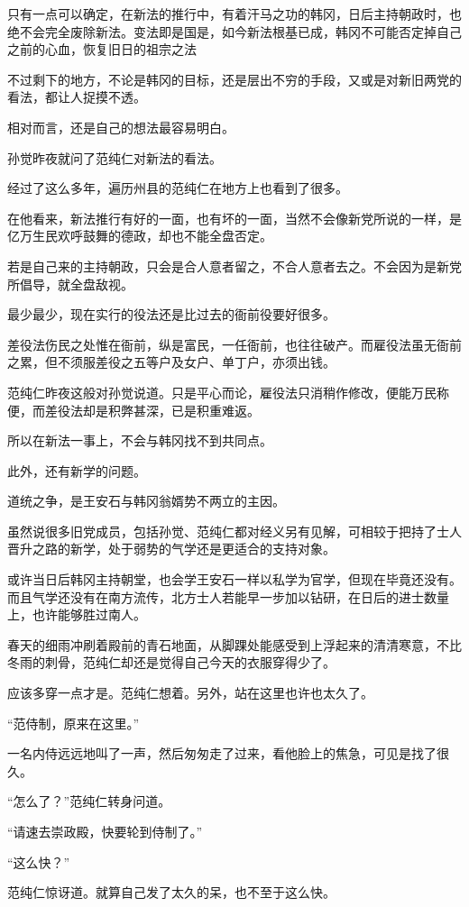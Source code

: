 只有一点可以确定，在新法的推行中，有着汗马之功的韩冈，日后主持朝政时，也绝不会完全废除新法。变法即是国是，如今新法根基已成，韩冈不可能否定掉自己之前的心血，恢复旧日的祖宗之法

不过剩下的地方，不论是韩冈的目标，还是层出不穷的手段，又或是对新旧两党的看法，都让人捉摸不透。

相对而言，还是自己的想法最容易明白。

孙觉昨夜就问了范纯仁对新法的看法。

经过了这么多年，遍历州县的范纯仁在地方上也看到了很多。

在他看来，新法推行有好的一面，也有坏的一面，当然不会像新党所说的一样，是亿万生民欢呼鼓舞的德政，却也不能全盘否定。

若是自己来的主持朝政，只会是合人意者留之，不合人意者去之。不会因为是新党所倡导，就全盘敌视。

最少最少，现在实行的役法还是比过去的衙前役要好很多。

差役法伤民之处惟在衙前，纵是富民，一任衙前，也往往破产。而雇役法虽无衙前之累，但不须服差役之五等户及女户、单丁户，亦须出钱。

范纯仁昨夜这般对孙觉说道。只是平心而论，雇役法只消稍作修改，便能万民称便，而差役法却是积弊甚深，已是积重难返。

所以在新法一事上，不会与韩冈找不到共同点。

此外，还有新学的问题。

道统之争，是王安石与韩冈翁婿势不两立的主因。

虽然说很多旧党成员，包括孙觉、范纯仁都对经义另有见解，可相较于把持了士人晋升之路的新学，处于弱势的气学还是更适合的支持对象。

或许当日后韩冈主持朝堂，也会学王安石一样以私学为官学，但现在毕竟还没有。而且气学还没有在南方流传，北方士人若能早一步加以钻研，在日后的进士数量上，也许能够胜过南人。

春天的细雨冲刷着殿前的青石地面，从脚踝处能感受到上浮起来的清清寒意，不比冬雨的刺骨，范纯仁却还是觉得自己今天的衣服穿得少了。

应该多穿一点才是。范纯仁想着。另外，站在这里也许也太久了。

“范侍制，原来在这里。”

一名内侍远远地叫了一声，然后匆匆走了过来，看他脸上的焦急，可见是找了很久。

“怎么了？”范纯仁转身问道。

“请速去崇政殿，快要轮到侍制了。”

“这么快？”

范纯仁惊讶道。就算自己发了太久的呆，也不至于这么快。


